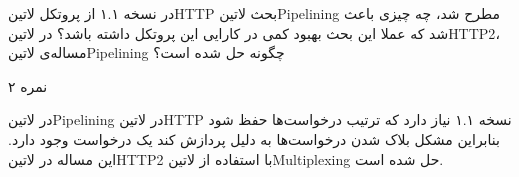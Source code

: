 \documentclass[../main.tex]{subfiles}
\begin{document}

در نسخه ۱.۱ از پروتکل ‌لاتین{HTTP} بحث ‌لاتین{Pipelining} مطرح شد، چه چیزی باعث شد که عملا این بحث بهبود کمی در کارایی این پروتکل داشته باشد؟
در ‌لاتین{HTTP2}، مساله‌ی ‌لاتین{Pipelining} چگونه حل شده است؟

۲ نمره


در ‌لاتین{Pipelining} در ‌لاتین{HTTP} نسخه ۱.۱ نیاز دارد که ترتیب درخواست‌ها حفظ شود بنابراین مشکل بلاک شدن درخواست‌ها به دلیل پردازش کند یک درخواست
وجود دارد. این مساله در ‌لاتین{HTTP2} با استفاده از ‌لاتین{Multiplexing} حل شده است.

\end{document}
